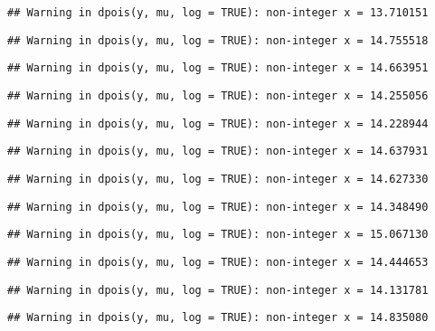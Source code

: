 \documentclass[
]{article}
\begin{document}
\begin{verbatim}
## Warning in dpois(y, mu, log = TRUE): non-integer x = 13.710151
\end{verbatim}

\begin{verbatim}
## Warning in dpois(y, mu, log = TRUE): non-integer x = 14.755518
\end{verbatim}

\begin{verbatim}
## Warning in dpois(y, mu, log = TRUE): non-integer x = 14.663951
\end{verbatim}

\begin{verbatim}
## Warning in dpois(y, mu, log = TRUE): non-integer x = 14.255056
\end{verbatim}

\begin{verbatim}
## Warning in dpois(y, mu, log = TRUE): non-integer x = 14.228944
\end{verbatim}

\begin{verbatim}
## Warning in dpois(y, mu, log = TRUE): non-integer x = 14.637931
\end{verbatim}

\begin{verbatim}
## Warning in dpois(y, mu, log = TRUE): non-integer x = 14.627330
\end{verbatim}

\begin{verbatim}
## Warning in dpois(y, mu, log = TRUE): non-integer x = 14.348490
\end{verbatim}

\begin{verbatim}
## Warning in dpois(y, mu, log = TRUE): non-integer x = 15.067130
\end{verbatim}

\begin{verbatim}
## Warning in dpois(y, mu, log = TRUE): non-integer x = 14.444653
\end{verbatim}

\begin{verbatim}
## Warning in dpois(y, mu, log = TRUE): non-integer x = 14.131781
\end{verbatim}

\begin{verbatim}
## Warning in dpois(y, mu, log = TRUE): non-integer x = 14.835080
\end{verbatim}
\end{document}
